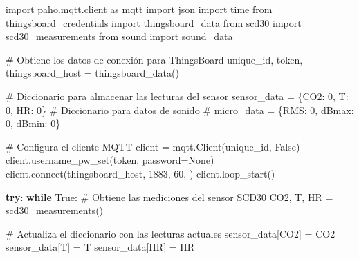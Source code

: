 \documentclass[
  letterpaper,
]{scrbook}
\newenvironment{Shaded}{\begin{snugshade}}{\end{snugshade}}
\newcommand{\CommentTok}[1]{\textcolor[rgb]{0.37,0.37,0.37}{#1}}
\newcommand{\ControlFlowTok}[1]{\textcolor[rgb]{0.00,0.23,0.31}{\textbf{#1}}}
\newcommand{\DecValTok}[1]{\textcolor[rgb]{0.68,0.00,0.00}{#1}}
\newcommand{\ExtensionTok}[1]{\textcolor[rgb]{0.00,0.23,0.31}{#1}}
\newcommand{\ImportTok}[1]{\textcolor[rgb]{0.00,0.46,0.62}{#1}}
\newcommand{\NormalTok}[1]{\textcolor[rgb]{0.00,0.23,0.31}{#1}}
\newcommand{\OperatorTok}[1]{\textcolor[rgb]{0.37,0.37,0.37}{#1}}
\newcommand{\StringTok}[1]{\textcolor[rgb]{0.13,0.47,0.30}{#1}}
\newcommand{\VariableTok}[1]{\textcolor[rgb]{0.07,0.07,0.07}{#1}}
\begin{document}
\begin{Shaded}
\begin{Highlighting}[]
\ImportTok{import}\NormalTok{ paho.mqtt.client }\ImportTok{as}\NormalTok{ mqtt}
\ImportTok{import}\NormalTok{ json}
\ImportTok{import}\NormalTok{ time}
\ImportTok{from}\NormalTok{ thingsboard\_credentials }\ImportTok{import}\NormalTok{ thingsboard\_data}
\ImportTok{from}\NormalTok{ scd30 }\ImportTok{import}\NormalTok{ scd30\_measurements}
\ImportTok{from}\NormalTok{ sound }\ImportTok{import}\NormalTok{ sound\_data}

\CommentTok{\# Obtiene los datos de conexión para ThingsBoard}
\NormalTok{unique\_id, token, thingsboard\_host }\OperatorTok{=}\NormalTok{ thingsboard\_data()}

\CommentTok{\# Diccionario para almacenar las lecturas del sensor}
\NormalTok{sensor\_data }\OperatorTok{=}\NormalTok{ \{}\StringTok{\textquotesingle{}CO2\textquotesingle{}}\NormalTok{: }\DecValTok{0}\NormalTok{, }\StringTok{\textquotesingle{}T\textquotesingle{}}\NormalTok{: }\DecValTok{0}\NormalTok{, }\StringTok{\textquotesingle{}HR\textquotesingle{}}\NormalTok{: }\DecValTok{0}\NormalTok{\}}
\CommentTok{\# Diccionario para datos de sonido}
\CommentTok{\# micro\_data = \{\textquotesingle{}RMS\textquotesingle{}: 0, \textquotesingle{}dBmax\textquotesingle{}: 0, \textquotesingle{}dBmin\textquotesingle{}: 0\}  }

\CommentTok{\# Configura el cliente MQTT}
\NormalTok{client }\OperatorTok{=}\NormalTok{ mqtt.Client(unique\_id, }\VariableTok{False}\NormalTok{)}
\NormalTok{client.username\_pw\_set(token, password}\OperatorTok{=}\VariableTok{None}\NormalTok{)}
\NormalTok{client.}\ExtensionTok{connect}\NormalTok{(thingsboard\_host, }\DecValTok{1883}\NormalTok{, }\DecValTok{60}\NormalTok{, }\StringTok{\textquotesingle{}\textquotesingle{}}\NormalTok{)}
\NormalTok{client.loop\_start()}

\ControlFlowTok{try}\NormalTok{:}
    \ControlFlowTok{while} \VariableTok{True}\NormalTok{:}
        \CommentTok{\# Obtiene las mediciones del sensor SCD30}
\NormalTok{        CO2, T, HR }\OperatorTok{=}\NormalTok{ scd30\_measurements()}

        \CommentTok{\# Actualiza el diccionario con las lecturas actuales}
\NormalTok{        sensor\_data[}\StringTok{\textquotesingle{}CO2\textquotesingle{}}\NormalTok{] }\OperatorTok{=}\NormalTok{ CO2}
\NormalTok{        sensor\_data[}\StringTok{\textquotesingle{}T\textquotesingle{}}\NormalTok{] }\OperatorTok{=}\NormalTok{ T}
\NormalTok{        sensor\_data[}\StringTok{\textquotesingle{}HR\textquotesingle{}}\NormalTok{] }\OperatorTok{=}\NormalTok{ HR}


\end{Highlighting}
\end{Shaded}
\end{document}
